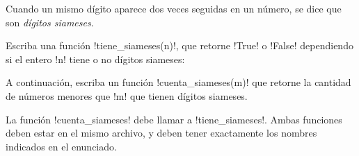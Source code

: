\documentclass[12pt,spanish,letterpaper]{article}
\begin{document}
  Cuando un mismo dígito aparece dos veces seguidas en un número,
  se dice que son \emph{dígitos siameses}.

  Escriba una función \li!tiene_siameses(n)!,
  que retorne \li!True! o \li!False!
  dependiendo si el entero \li!n! tiene o no dígitos siameses:

  

  A continuación,
  escriba un función \li!cuenta_siameses(m)!
  que retorne la cantidad de números menores que \li!m!
  que tienen dígitos siameses.

  

  La función \li!cuenta_siameses!
  debe llamar a \li!tiene_siameses!.
  Ambas funciones deben estar en el mismo archivo,
  y deben tener exactamente los nombres indicados en el enunciado.
\end{document}
